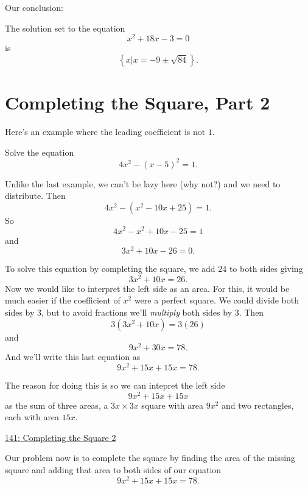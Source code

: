 \documentclass{ximera}
\begin{document}
\begin{example}
\begin{explanation}
Our conclusion:

The solution set to the equation
\[
      x^2 +18x - 3 = 0
\]
is
\[
 \left\{ x | x =  -9 \pm \sqrt{84} \right\} .
\]


\end{explanation}
\end{example}







\section{Completing the Square, Part 2}

Here's an example where the leading coefficient is not $1$.

\begin{example}  \label{Ex:er433r3rfsdstr}
Solve the equation
\[
      4x^2 - (x-5)^2 = 1 .
\]

\begin{explanation}
Unlike the last example, we can't be lazy here (why not?) and we need to distribute. Then
\[
       4x^2 - (x^2 - 10x +25) = 1 . 
\]
So
\[
    4x^2 - x^2 + 10x - 25 = 1 
\]
and
\[
      3x^2 + 10x - 26 = 0.
\]

To solve this equation by completing the square, we add $24$ to both sides giving
\[
    3x^2 + 10x = 26.
\]
Now we would like to interpret the left side as an area. For this, it would be much easier if the coefficient of $x^2$ were a perfect square. We could divide both sides by $3$, but to avoid fractions we'll \emph{multiply} both sides by $3$. Then
\[
  3 (3x^2 +10x) = 3(26)
\]
and
\[
       9x^2 + 30x = 78.
\]
And we'll write this last equation as
\[
     9x^2 + 15x + 15x = 78.
\]

The reason for doing this is so we can intepret the left side
\[
  9x^2 + 15x + 15x
\]
as the sum of three areas, a $3x \times 3x$ square with area $9x^2$ and two rectangles, each with area $15x$. 

\begin{onlineOnly}
    \begin{center}
\end{center}
\end{onlineOnly}

\href{https://www.desmos.com/calculator/7tfjwvehju}{141: Completing the Square 2}

Our problem now is to complete the square by finding the area of the missing square and adding that area to both sides of our equation
\[
   9x^2 + 15x + 15x = 78 .
\]


\end{explanation}
\end{example}
\end{document}
